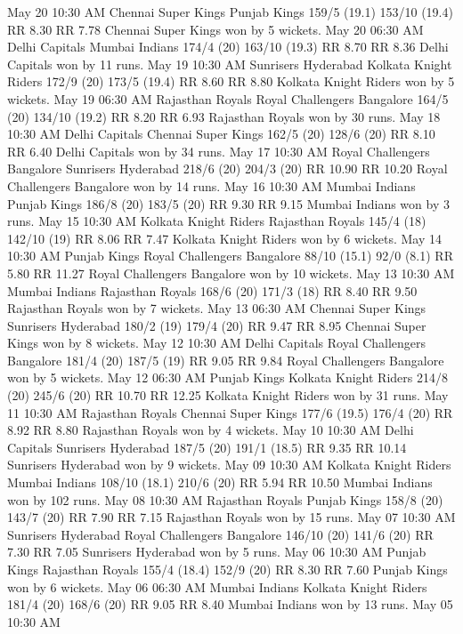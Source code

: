 May 20
10:30 AM
Chennai Super Kings
Punjab Kings
159/5 (19.1)
153/10 (19.4)
RR 8.30
RR 7.78
Chennai Super Kings won by 5 wickets.
May 20
06:30 AM
Delhi Capitals
Mumbai Indians
174/4 (20)
163/10 (19.3)
RR 8.70
RR 8.36
Delhi Capitals won by 11 runs.
May 19
10:30 AM
Sunrisers Hyderabad
Kolkata Knight Riders
172/9 (20)
173/5 (19.4)
RR 8.60
RR 8.80
Kolkata Knight Riders won by 5 wickets.
May 19
06:30 AM
Rajasthan Royals
Royal Challengers Bangalore
164/5 (20)
134/10 (19.2)
RR 8.20
RR 6.93
Rajasthan Royals won by 30 runs.
May 18
10:30 AM
Delhi Capitals
Chennai Super Kings
162/5 (20)
128/6 (20)
RR 8.10
RR 6.40
Delhi Capitals won by 34 runs.
May 17
10:30 AM
Royal Challengers Bangalore
Sunrisers Hyderabad
218/6 (20)
204/3 (20)
RR 10.90
RR 10.20
Royal Challengers Bangalore won by 14 runs.
May 16
10:30 AM
Mumbai Indians
Punjab Kings
186/8 (20)
183/5 (20)
RR 9.30
RR 9.15
Mumbai Indians won by 3 runs.
May 15
10:30 AM
Kolkata Knight Riders
Rajasthan Royals
145/4 (18)
142/10 (19)
RR 8.06
RR 7.47
Kolkata Knight Riders won by 6 wickets.
May 14
10:30 AM
Punjab Kings
Royal Challengers Bangalore
88/10 (15.1)
92/0 (8.1)
RR 5.80
RR 11.27
Royal Challengers Bangalore won by 10 wickets.
May 13
10:30 AM
Mumbai Indians
Rajasthan Royals
168/6 (20)
171/3 (18)
RR 8.40
RR 9.50
Rajasthan Royals won by 7 wickets.
May 13
06:30 AM
Chennai Super Kings
Sunrisers Hyderabad
180/2 (19)
179/4 (20)
RR 9.47
RR 8.95
Chennai Super Kings won by 8 wickets.
May 12
10:30 AM
Delhi Capitals
Royal Challengers Bangalore
181/4 (20)
187/5 (19)
RR 9.05
RR 9.84
Royal Challengers Bangalore won by 5 wickets.
May 12
06:30 AM
Punjab Kings
Kolkata Knight Riders
214/8 (20)
245/6 (20)
RR 10.70
RR 12.25
Kolkata Knight Riders won by 31 runs.
May 11
10:30 AM
Rajasthan Royals
Chennai Super Kings
177/6 (19.5)
176/4 (20)
RR 8.92
RR 8.80
Rajasthan Royals won by 4 wickets.
May 10
10:30 AM
Delhi Capitals
Sunrisers Hyderabad
187/5 (20)
191/1 (18.5)
RR 9.35
RR 10.14
Sunrisers Hyderabad won by 9 wickets.
May 09
10:30 AM
Kolkata Knight Riders
Mumbai Indians
108/10 (18.1)
210/6 (20)
RR 5.94
RR 10.50
Mumbai Indians won by 102 runs.
May 08
10:30 AM
Rajasthan Royals
Punjab Kings
158/8 (20)
143/7 (20)
RR 7.90
RR 7.15
Rajasthan Royals won by 15 runs.
May 07
10:30 AM
Sunrisers Hyderabad
Royal Challengers Bangalore
146/10 (20)
141/6 (20)
RR 7.30
RR 7.05
Sunrisers Hyderabad won by 5 runs.
May 06
10:30 AM
Punjab Kings
Rajasthan Royals
155/4 (18.4)
152/9 (20)
RR 8.30
RR 7.60
Punjab Kings won by 6 wickets.
May 06
06:30 AM
Mumbai Indians
Kolkata Knight Riders
181/4 (20)
168/6 (20)
RR 9.05
RR 8.40
Mumbai Indians won by 13 runs.
May 05
10:30 AM

